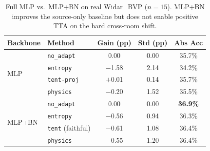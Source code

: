 \begin{table}[h]
\centering
\caption{Full MLP vs.\ MLP+BN on real Widar\_BVP ($n{=}15$). MLP+BN improves the source-only baseline but does not enable positive TTA on the hard cross-room shift.}
\label{tab:arch_3way}
\small
\begin{tabular}{llccc}
\toprule
\textbf{Backbone} & \textbf{Method} & \textbf{Gain (pp)} & \textbf{Std (pp)} & \textbf{Abs Acc} \\
\midrule
\multirow{4}{*}{MLP} & \texttt{no\_adapt} & 0.00 & 0.00 & 35.7\% \\
 & \texttt{entropy} & $-$1.58 & 2.14 & 34.2\% \\
 & \texttt{tent-proj} & $+$0.01 & 0.14 & 35.7\% \\
 & \texttt{physics} & $-$0.20 & 1.52 & 35.5\% \\
\midrule
\multirow{4}{*}{MLP+BN} & \texttt{no\_adapt} & 0.00 & 0.00 & \textbf{36.9\%} \\
 & \texttt{entropy} & $-$0.56 & 0.94 & 36.3\% \\
 & \texttt{tent} (faithful) & $-$0.61 & 1.08 & 36.4\% \\
 & \texttt{physics} & $-$0.55 & 1.20 & 36.4\% \\
\bottomrule
\end{tabular}
\end{table}
\label{app:arch_full}

